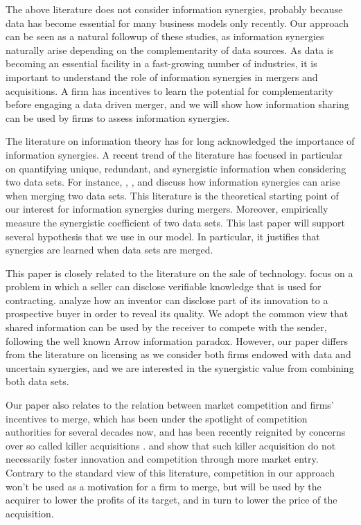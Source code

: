 \documentclass[a4paper,leqno]{article}%
\begin{document}
The above literature does not consider information synergies, probably because data has become essential for many business models only recently. Our approach can be seen as a natural followup of these studies, as information synergies naturally arise depending on the complementarity of data sources. As data is becoming an essential facility in a fast-growing number of industries, it is important to understand the role of information synergies in mergers and acquisitions. A firm has incentives to learn the potential for complementarity before engaging a data driven merger, and we will show how information sharing can be used by firms to assess information synergies.


The literature on information theory has for long acknowledged the importance of information synergies. A recent trend of the literature has focused in particular on quantifying unique, redundant, and synergistic information when considering two data sets. For instance, \cite{bertschinger2014quantifying}, \cite{Griffith2014}, and \cite{olbrich2015information} discuss how information synergies can arise when merging two data sets. This literature is the theoretical starting point of our interest for information synergies during mergers. Moreover, \cite{sootla2017analyzing} empirically measure the synergistic coefficient of two data sets. This last paper will support several hypothesis that we use in our model. In particular, it justifies that synergies are learned when data sets are merged. 


\medskip

This paper is closely related to the literature on the sale of technology. \cite{d2000bargaining} focus on a problem in which a seller can disclose verifiable knowledge that is used for contracting. \cite{anton2002sale} analyze how an inventor can disclose part of its innovation to a prospective buyer in order to reveal its quality. We adopt the common view that shared information can be used by the receiver to compete with the sender, following the well known Arrow information paradox. However, our paper differs from the literature on licensing as we consider both firms endowed with data and uncertain synergies, and we are interested in the synergistic value from combining both data sets. 

\medskip

Our paper also relates to the relation between market competition and firms' incentives to merge, which has been under the spotlight of competition authorities for several decades now, and has been recently reignited by concerns over so called killer acquisitions \citep{cunningham2021killer}. \cite{kamepalli2020kill} and \cite{shelegia2021kill} show that such killer acquisition do not necessarily foster innovation and competition through more market entry. Contrary to the standard view of this literature, competition in our approach won't be used as a motivation for a firm to merge, but will be used by the acquirer to lower the profits of its target, and in turn to lower the price of the acquisition.
\end{document}
